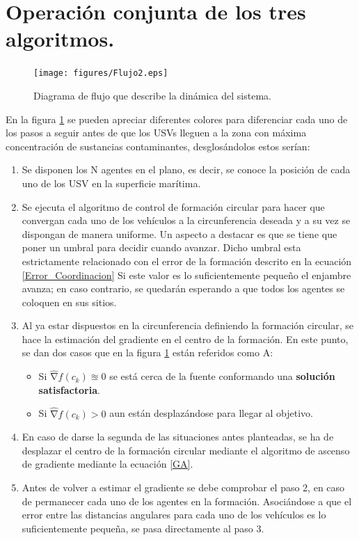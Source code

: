 \section{Operación conjunta de los tres algoritmos.}

\begin{figure}[H]
\centering
\texttt{[image: figures/Flujo2.eps]}
\caption{Diagrama de flujo que describe la dinámica del sistema.} \label{fig:Flujo}
\end{figure}

En la figura \ref{fig:Flujo} se pueden apreciar diferentes colores para diferenciar cada uno de los pasos a seguir antes de que los USVs lleguen a la zona con máxima concentración de sustancias contaminantes, desglosándolos estos serían:
\newpage
\begin{enumerate}
	\item Se disponen los N agentes en el plano, es decir, se conoce la posición de cada uno de los USV en la superficie marítima.
	\item Se ejecuta el algoritmo de control de formación circular para hacer que convergan cada uno de los vehículos a la circunferencia deseada y a su vez se dispongan de manera uniforme. Un aspecto a destacar es que se tiene que poner un umbral para decidir cuando avanzar. Dicho umbral esta estrictamente relacionado con el error de la formación descrito en la ecuación \ref{Error_Coordinacion}
	Si este valor es lo suficientemente pequeño el enjambre avanza; en caso contrario, se quedarán esperando a que todos los agentes se coloquen en sus sitios. 
	\item Al ya estar dispuestos en la circunferencia definiendo la formación circular, se hace la estimación del gradiente en el centro de la formación. En este punto, se dan dos casos que en la figura \ref{fig:Flujo} están referidos como A:
	\begin{itemize}
		\item Si $\widehat{\mathrm{\nabla }}{f}\left(c_{k}\right)\approxeq0$ se está cerca de la fuente conformando una \textbf{solución satisfactoria}.
		\item Si $\widehat{\mathrm{\nabla }}{f}\left(c_{k}\right)>0$ aun están desplazándose para llegar al objetivo.
	\end{itemize}
	\item En caso de darse la segunda de las situaciones antes planteadas, se ha de desplazar el centro de la formación circular mediante el algoritmo de ascenso de gradiente mediante la ecuación \ref{GA}.
	\item Antes de volver a estimar el gradiente se debe comprobar el paso 2, en caso de permanecer cada uno de los agentes en la formación. Asociándose a que el error entre las distancias angulares para cada uno de los vehículos es lo suficientemente pequeña, se pasa directamente al paso 3.
\end{enumerate}








